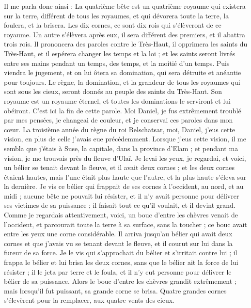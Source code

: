\begin{multicols}{2}
Il me parla donc ainsi : La quatrième bête est un quatrième royaume qui existera sur la terre, différent de tous les royaumes, et qui dévorera toute la terre, la foulera, et la brisera.
Les dix cornes, ce sont dix rois qui s'élèveront de ce royaume. Un autre s'élèvera après eux, il sera différent des premiers, et il abattra trois rois.
Il prononcera des paroles contre le Très-Haut, il opprimera les saints du Très-Haut, et il espérera changer les temps et la loi ; et les saints seront livrés entre ses mains pendant un temps, des temps, et la moitié d’un temps.
Puis viendra le jugement, et on lui ôtera sa domination, qui sera détruite et anéantie pour toujours.
Le règne, la domination, et la grandeur de tous les royaumes qui sont sous les cieux, seront donnés au peuple des saints du Très-Haut. Son royaume est un royaume éternel, et toutes les dominations le serviront et lui obéiront.
C’est ici la fin de cette parole. Moi Daniel, je fus extrêmement troublé par mes pensées, je changeai de couleur, et je conservai ces paroles dans mon cœur.
\VerseOne{}La troisième année du règne du roi Belschatsar, moi, Daniel, j’eus cette vision, en plus de celle j’avais eue précédemment.
Lorsque j’eus cette vision, il me sembla que j’étais à Suse, la capitale, dans la province d'Elam ; et pendant ma vision, je me trouvais près du fleuve d’Ulaï.
Je levai les yeux, je regardai, et voici, un bélier se tenait devant le fleuve, et il avait deux cornes ; et les deux cornes étaient hautes, mais l'une était plus haute que l'autre, et la plus haute s'éleva sur la dernière.
Je vis ce bélier qui frappait de ses cornes à l'occident, au nord, et au midi ; aucune bête ne pouvait lui résister, et il n'y avait personne pour délivrer ses victimes de sa puissance ; il faisait tout ce qu’il voulait, et il devint grand.
Comme je regardais attentivement, voici, un bouc d'entre les chèvres venait de l'occident, et parcourait toute la terre à sa surface, sans la toucher ; ce bouc avait entre les yeux une corne considérable.
Il arriva jusqu'au bélier qui avait deux cornes et que j'avais vu se tenant devant le fleuve, et il courut sur lui dans la fureur de sa force.
Je le vis qui s’approchait du bélier et s'irritait contre lui ; il frappa le bélier et lui brisa les deux cornes, sans que le bélier ait la force de lui résister ; il le jeta par terre et le foula, et il n’y eut personne pour délivrer le bélier de sa puissance.
Alors le bouc d'entre les chèvres grandit extrêmement ; mais lorsqu’il fut puissant, sa grande corne se brisa. Quatre grandes cornes s’élevèrent pour la remplacer, aux quatre vents des cieux.

\end{multicols}
